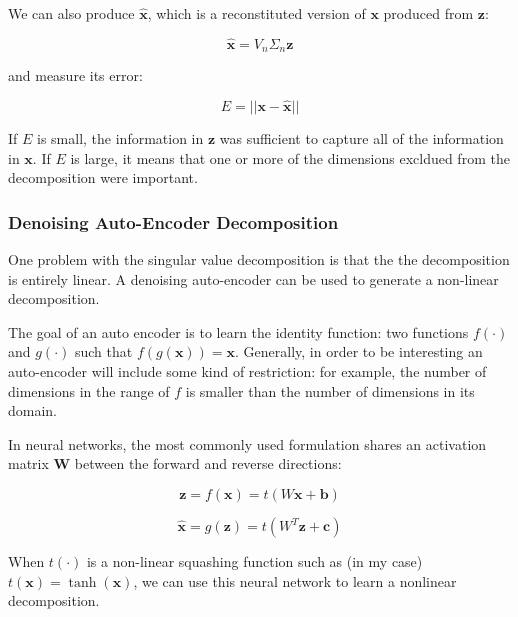 \documentclass{article}
\begin{document}
We can also produce $\hat{\mathbf{x}}$, which is a reconstituted version of $\mathbf{x}$ produced from $\mathbf{z}$:

\begin{equation}
\hat{\mathbf{x}} = V_n \Sigma_n \mathbf{z}
\end{equation}

and measure its error:

\begin{equation}
\label{eqn:decomp-error}
E = || \mathbf{x - \hat{x}} ||
\end{equation}

If $E$ is small, the information in $\mathbf{z}$ was sufficient to capture all of the information in $\mathbf{x}$.  If $E$ is large, it means that one or more of the dimensions excldued from the decomposition were important.


\subsubsection{Denoising Auto-Encoder Decomposition}

One problem with the singular value decomposition is that the the decomposition is entirely linear.  A denoising auto-encoder can be used to generate a non-linear decomposition.

The goal of an auto encoder is to learn the identity function: two functions $f(\cdot)$ and $g(\cdot)$ such that $f(g(\mathbf{x})) = \mathbf{x}$.  Generally, in order to be interesting an auto-encoder will include some kind of restriction: for example, the number of dimensions in the range of $f$ is smaller than the number of dimensions in its domain.

In neural networks, the most commonly used formulation shares an activation matrix $\mathbf{W}$ between the forward and reverse directions:

\begin{equation}
\label{eqn:autoencoder-encode}
\mathbf{z} = f(\mathbf{x}) = t(W\mathbf{x} + \mathbf{b})
\end{equation}

\begin{equation}
\label{eqn:autoencoder-decode}
\hat{\mathbf{x}} = g(\mathbf{z}) = t(W^T\mathbf{z} + \mathbf{c})
\end{equation}

When $t(\cdot)$ is a non-linear squashing function such as (in my case) $t(\mathbf{x}) = \tanh(\mathbf{x})$, we can use this neural network to learn a nonlinear decomposition.
\end{document}
